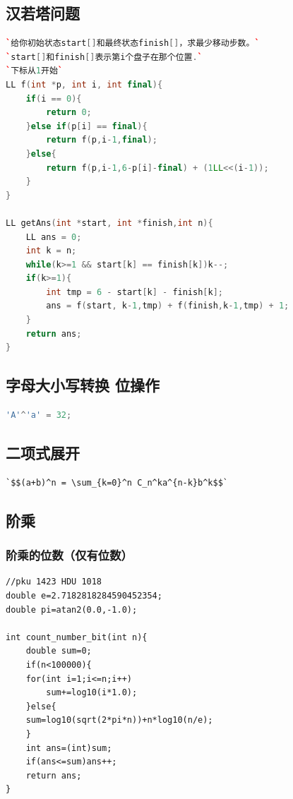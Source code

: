 \documentclass[a4paper]{article}
\begin{document}
\begin{CJK*}{UTF8}{gbsn}
\begin{multicols}{3}
\begin{flushleft}
\subsection{汉若塔问题}
\begin{lstlisting}[language={c++}]
`给你初始状态start[]和最终状态finish[]，求最少移动步数。`
`start[]和finish[]表示第i个盘子在那个位置.`
`下标从1开始`
LL f(int *p, int i, int final){
    if(i == 0){
        return 0;
    }else if(p[i] == final){
        return f(p,i-1,final);
    }else{
        return f(p,i-1,6-p[i]-final) + (1LL<<(i-1));
    }
}

LL getAns(int *start, int *finish,int n){
    LL ans = 0;
    int k = n;
    while(k>=1 && start[k] == finish[k])k--;
    if(k>=1){
        int tmp = 6 - start[k] - finish[k];
        ans = f(start, k-1,tmp) + f(finish,k-1,tmp) + 1;
    }
    return ans;
}

\end{lstlisting}


\subsection{字母大小写转换 位操作}
\begin{lstlisting}[language={c++}]
'A'^'a' = 32; 
\end{lstlisting}


\subsection{二项式展开}
\begin{lstlisting}
`$$(a+b)^n = \sum_{k=0}^n C_n^ka^{n-k}b^k$$`
\end{lstlisting}


\subsection{阶乘}

\subsubsection{阶乘的位数（仅有位数）}
\begin{lstlisting}
//pku 1423 HDU 1018
double e=2.7182818284590452354;
double pi=atan2(0.0,-1.0);

int count_number_bit(int n){
	double sum=0;
	if(n<100000){
	for(int i=1;i<=n;i++)
		sum+=log10(i*1.0);
	}else{
	sum=log10(sqrt(2*pi*n))+n*log10(n/e);
	}
	int ans=(int)sum;
	if(ans<=sum)ans++;
	return ans;
} 
\end{lstlisting}



\end{flushleft}
\end{multicols}
\end{CJK*}
\end{document}
